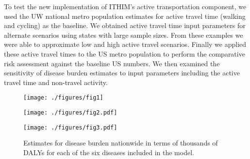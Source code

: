 To test the new implementation of ITHIM's active transportation
component, we used the UW national metro population estimates for
active travel time (walking and cycling) as the baseline. We obtained
active travel time input parameters for alternate scenarios using
states with large sample sizes. From these examples we were able to
approximate low and high active travel scenarios. Finally we applied
these active travel times to the US metro population to perform the
comparative risk assessment against the baseline US numbers. We then
examined the sensitivity of disease burden estimates to input
parameters including the active travel time and non-travel activity.

\begin{figure}[t]
  \centerline{\texttt{[image: ./figures/fig1]}}
    \caption{}\label{fig1}
\end{figure}

\begin{figure}[t]
  \centerline{\texttt{[image: ./figures/fig2.pdf]}}
    \caption{}\label{fig2}
\end{figure}

\begin{figure}[t]
  \centerline{\texttt{[image: ./figures/fig3.pdf]}}
  \caption{Estimates for disease burden nationwide in terms of thousands of
    DALYs for each of the six diseases included in the model.
  }\label{fig3}
\end{figure}
